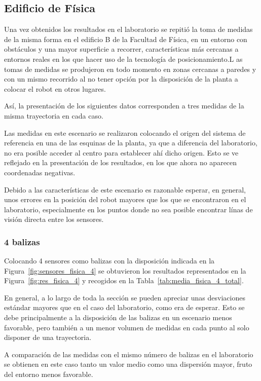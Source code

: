 \newpage
\subsection{Edificio de Física}

Una vez obtenidos los resultados en el laboratorio se repitió la toma de medidas de la misma forma en el edificio B de la Facultad de Física, en un entorno con obstáculos y una mayor superficie a recorrer, características más cercanas a entornos reales en los que hacer uso de la tecnología de posicionamiento.L
as tomas de medidas se produjeron en todo momento en zonas cercanas a paredes y con un mismo recorrido al no tener opción por la disposición de la planta a colocar el robot en otros lugares.

Así, la presentación de los siguientes datos corresponden a tres medidas de la misma trayectoria en cada caso.

Las medidas en este escenario se realizaron colocando el origen del sistema de referencia en una de las esquinas de la planta, ya que a diferencia del laboratorio, no era posible acceder al centro para establecer ahí dicho origen.
Esto se ve reflejado en la presentación de los resultados, en los que ahora no aparecen coordenadas negativas.

Debido a las características de este escenario es razonable esperar, en general, unos errores en la posición del robot mayores que los que se encontraron en el laboratorio, especialmente en los puntos donde no sea posible encontrar línas de visión directa entre los sensores.

\subsubsection{4 balizas}

Colocando 4 sensores como balizas con la disposición indicada en la Figura~\ref{fig:sensores_fisica_4} se obtuvieron los resultados representados en la Figura~\ref{fig:res_fisica_4} y recogidos en la Tabla~\ref{tab:media_fisica_4_total}.

En general, a lo largo de toda la sección se pueden apreciar unas desviaciones estándar mayores que en el caso del laboratorio, como era de esperar.
Esto se debe principalmente a la disposición de las balizas en un escenario menos favorable, pero también a un menor volumen de medidas en cada punto al solo disponer de una trayectoria.

A comparación de las medidas con el mismo número de balizas en el laboratorio se obtienen en este caso tanto un valor medio como una dispersión mayor, fruto del entorno menos favorable.


